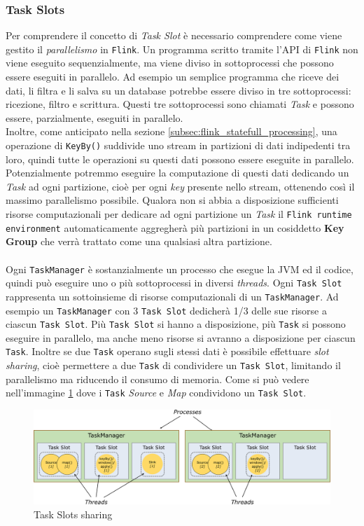 \subsubsection{Task Slots}
\label{subsubsec:flink_Task_slots}
Per comprendere il concetto di \textit{Task Slot} è necessario comprendere come viene gestito il \textit{parallelismo} in \texttt{Flink}.    
Un programma scritto tramite l'API di \texttt{Flink} non viene eseguito sequenzialmente, ma viene diviso in sottoprocessi che possono essere eseguiti in parallelo.
Ad esempio un semplice programma che riceve dei dati, li filtra e li salva su un database potrebbe essere diviso in tre sottoprocessi: ricezione, filtro e scrittura.
Questi tre sottoprocessi sono chiamati \textit{Task} e possono essere, parzialmente, eseguiti in parallelo.\\
Inoltre, come anticipato nella sezione \ref{subsec:flink_statefull_processing}, una operazione di \texttt{KeyBy()} suddivide uno stream in partizioni di dati
indipedenti tra loro, quindi tutte le operazioni su questi dati possono essere eseguite in parallelo.
Potenzialmente potremmo eseguire la computazione di questi dati dedicando un \textit{Task} ad ogni partizione, cioè per ogni \textit{key} presente nello stream,
ottenendo così il massimo parallelismo possibile.
Qualora non si abbia a disposizione sufficienti risorse computazionali per dedicare ad ogni partizione un \textit{Task} il \texttt{Flink runtime environment} 
automaticamente aggregherà più partizioni in un cosiddetto \textbf{Key Group} che verrà trattato come una qualsiasi altra partizione.
\\\\
Ogni \texttt{TaskManager} è sostanzialmente un processo che esegue la JVM ed il codice, quindi può eseguire uno o più sottoprocessi in diversi \textit{threads}.
Ogni \texttt{Task Slot} rappresenta un sottoinsieme di risorse computazionali di un \texttt{TaskManager}.
Ad esempio un \texttt{TaskManager} con 3 \texttt{Task Slot} dedicherà 1/3 delle sue risorse a ciascun \texttt{Task Slot}.
Più \texttt{Task Slot} si hanno a disposizione, più \texttt{Task} si possono eseguire in parallelo, ma anche meno risorse si avranno a disposizione per ciascun \texttt{Task}.
Inoltre se due \texttt{Task} operano sugli stessi dati è possibile effettuare \textit{slot sharing}, cioè permettere a due \texttt{Task} di condividere un \texttt{Task Slot}, limitando il parallelismo ma riducendo il consumo di memoria.
Come si può vedere nell'immagine \ref{fig:flink_slots} dove i \texttt{Task} \textit{Source} e \textit{Map} condividono un \texttt{Task Slot}.
\begin{figure}[htbp]
    \centering
    \includegraphics[width=\textwidth]{images/flink/Tasks_slots.jpg}
    \caption{Task Slots sharing}
    \label{fig:flink_slots}
\end{figure}

